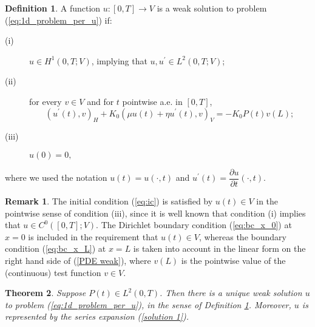 \documentclass[12pt,a4paper]{amsart}
\newtheorem{theorem}{Theorem}[section]
\theoremstyle{definition}
\newtheorem{definition}[theorem]{Definition}
\newtheorem{remark}{Remark}
\begin{document}
\begin{definition}
\label{def weak sol}A function $u:\left[ 0,T\right] \rightarrow V$ is a weak
solution to problem (\ref{eq:1d_problem_per_u}) if:

\begin{description}
\item[(i)] $u\in H^{1}\left( 0,T;V\right) $, implying that $u,u^{\prime }\in L^{2}\left(
0,T;V\right) $;

\item[(ii)] for every $v\in V$ and for $t$ pointwise a.e. in $\left[ 0,T\right] $,
\begin{equation}
\left( u^{\prime }\left( t\right) ,v\right) _{H}+K_{0}\left( \mu u\left(
t\right) +\eta u^{\prime }\left( t\right) ,v\right) _{V}=-K_{0}P\left(
t\right) v\left( L\right) ;  \label{PDE weak}
\end{equation}

\item[(iii)] $u\left( 0\right) =0,$
\end{description}
where we used the notation $%
u\left( t\right) =u\left( \cdot ,t\right) $ and $u^{\prime }\left( t\right) =%
\dfrac{\partial u}{\partial t}\left( \cdot ,t\right) $.
\end{definition}



\begin{remark}
The initial condition (\ref{eq:ic}) is satisfied by $u\left( t\right)
\in V$ in the pointwise sense of condition (iii), since it is well known that
condition (i) implies that $u\in C^{0}\left( \left[ 0,T\right] ;V\right) $.
The Dirichlet boundary condition (\ref{eq:bc_x_0}) at $x=0$ is included in the requirement
that $u\left( t\right) \in V$, whereas the boundary condition (\ref{eq:bc_x_L}) at $x=L$ is
taken into account in the linear form on the right hand side of (\ref{PDE
weak}), where $v\left( L\right) $ is the pointwise value of the (continuous)
test function $v\in V$.
\end{remark}

\begin{theorem}
Suppose $P(t)\in L^{2}(0,T)$. Then there is a unique weak solution $u$ to problem (\ref{eq:1d_problem_per_u}), in the sense of Definition \ref{def weak sol}. Moreover, $%
u$ is represented by the series expansion (\ref{solution 1}).
\end{theorem}
\end{document}

